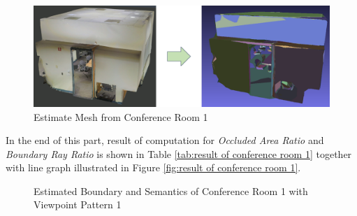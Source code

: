 \documentclass[11pt, a4paper,oneside,chapterprefix=false]{scrbook}
\begin{document}
\vspace{30pt}

\begin{figure}[H]
    \centering
    \includegraphics*[width=1.0\textwidth]{figures/estimate conf1.png}
    \caption{Estimate Mesh from Conference Room 1}
    \label{fig:estimate mesh from conference room 1}
\end{figure}

\vspace{30pt}

In the end of this part, result of computation for \emph{Occluded Area Ratio} and \emph{Boundary Ray Ratio} is shown in Table \ref{tab:result of conference room 1} together with line graph illustrated in Figure \ref{fig:result of conference room 1}.


\begin{figure}[H]
    \centering
      \label{fig:conf1 b 200 0} \hfill
     \label{fig:conf1 s 200 0}
    \caption{Estimated Boundary and Semantics of Conference Room 1 with Viewpoint Pattern 1}
    \label{fig:conf1 0}
\end{figure}
\end{document}
